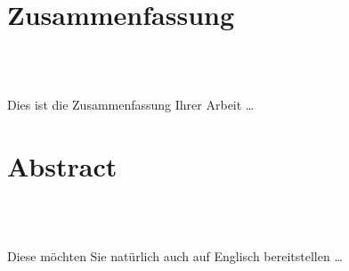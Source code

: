 \chapter*{Zusammenfassung}
\begin{center}
  \DocumentThesisTitle
  \\
  \vspace{.3cm}
  \DocumentAuthorPrename\ \DocumentAuthorName
\end{center}
Dies ist die Zusammenfassung Ihrer Arbeit \dots

\newpage

\chapter*{Abstract}
\begin{center}
  \DocumentThesisTitle
  \\
  \vspace{.3cm}
  \DocumentAuthorPrename\ \DocumentAuthorName
\end{center}
Diese möchten Sie natürlich auch auf Englisch bereitstellen \dots


